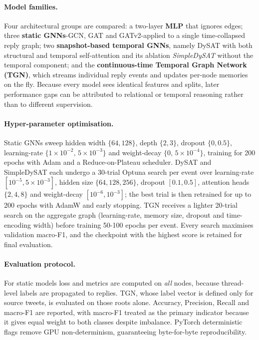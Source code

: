 \documentclass{cshonours}
\begin{document}
\paragraph{Model families.}
Four architectural groups are compared: a two-layer \textbf{MLP} that ignores edges; three \textbf{static GNNs}-GCN, GAT and GATv2-applied to a single time-collapsed reply graph; two \textbf{snapshot-based temporal GNNs}, namely DySAT with both structural and temporal self-attention and its ablation \emph{SimpleDySAT} without the temporal component; and the \textbf{continuous-time Temporal Graph Network (TGN)}, which streams individual reply events and updates per-node memories on the fly.  Because every model sees identical features and splits, later performance gaps can be attributed to relational or temporal reasoning rather than to different supervision.

\paragraph{Hyper-parameter optimisation.}
Static GNNs sweep hidden width \(\{64,128\}\), depth \(\{2,3\}\), dropout \(\{0,0.5\}\), learning-rate \(\{1\times10^{-2},\,5\times10^{-3}\}\) and weight-decay \(\{0,\,5\times10^{-4}\}\), training for 200 epochs with Adam and a Reduce-on-Plateau scheduler.  DySAT and SimpleDySAT each undergo a 30-trial Optuna search per event over learning-rate \([10^{-5},5\times10^{-3}]\), hidden size \(\{64,128,256\}\), dropout \([0.1,0.5]\), attention heads \(\{2,4,8\}\) and weight-decay \([10^{-6},10^{-3}]\); the best trial is then retrained for up to 200 epochs with AdamW and early stopping.  TGN receives a lighter 20-trial search on the aggregate graph (learning-rate, memory size, dropout and time-encoding width) before training 50-100 epochs per event.  Every search maximises validation macro-F1, and the checkpoint with the highest score is retained for final evaluation.

\paragraph{Evaluation protocol.}
For static models loss and metrics are computed on \emph{all} nodes, because thread-level labels are propagated to replies.  TGN, whose label vector is defined only for source tweets, is evaluated on those roots alone.  Accuracy, Precision, Recall and macro-F1 are reported, with macro-F1 treated as the primary indicator because it gives equal weight to both classes despite imbalance.  PyTorch deterministic flags remove GPU non-determinism, guaranteeing byte-for-byte reproducibility.
\end{document}
